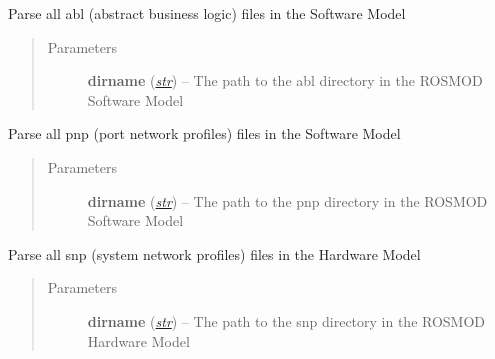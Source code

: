 \documentclass[letterpaper,10pt,english]{sphinxmanual}
\begin{document}
\begin{fulllineitems}
\begin{fulllineitems}
\begin{quote}
\begin{description}
\end{description}\end{quote}

\end{fulllineitems}


\begin{fulllineitems}
\label{class_Project:ROSMOD_Project.parse_abl}
Parse all abl (abstract business logic) files in the Software Model
\begin{quote}\begin{description}
\item[{Parameters}] \leavevmode
\textbf{dirname} (\href{http://docs.python.org/library/functions.html\#str}{\emph{str}}) -- The path to the abl directory in the ROSMOD Software Model

\end{description}\end{quote}

\end{fulllineitems}


\begin{fulllineitems}
\label{class_Project:ROSMOD_Project.parse_pnp}
Parse all pnp (port network profiles) files in the Software Model
\begin{quote}\begin{description}
\item[{Parameters}] \leavevmode
\textbf{dirname} (\href{http://docs.python.org/library/functions.html\#str}{\emph{str}}) -- The path to the pnp directory in the ROSMOD Software Model

\end{description}\end{quote}

\end{fulllineitems}


\begin{fulllineitems}
\label{class_Project:ROSMOD_Project.parse_snp}
Parse all snp (system network profiles) files in the Hardware Model
\begin{quote}\begin{description}
\item[{Parameters}] \leavevmode
\textbf{dirname} (\href{http://docs.python.org/library/functions.html\#str}{\emph{str}}) -- The path to the snp directory in the ROSMOD Hardware Model


\end{description}
\end{quote}
\end{fulllineitems}
\end{fulllineitems}
\end{document}
